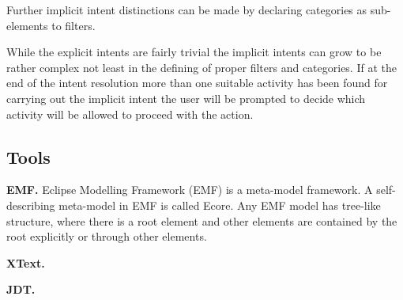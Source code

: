 Further implicit intent distinctions can be made by declaring categories as sub-elements to filters.

While the explicit intents are fairly trivial the implicit intents can grow to be rather complex not least in the defining of proper filters and categories. If at the end of the intent resolution more than one suitable activity has been found for carrying out the implicit intent the user will be prompted to decide which activity will be allowed to proceed with the action. 


\subsection{Tools}
\textbf{EMF.} Eclipse Modelling Framework (EMF) is a meta-model framework. A self-describing meta-model in EMF is called Ecore. Any EMF model has tree-like structure, where there is a root element and other elements are contained by the root explicitly or through other elements. 


\textbf{XText.}


\textbf{JDT.}
